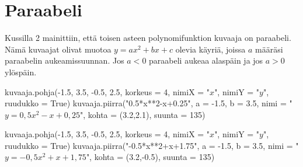 \section{Paraabeli}



Kussilla 2 mainittiin, että toisen asteen polynomifunktion kuvaaja on paraabeli. Nämä kuvaajat olivat muotoa $y=ax^2+bx+c$ olevia käyriä, joissa $a$ määräsi paraabelin aukeamissuunnan. Jos $a<0$ paraabeli aukeaa alaspäin ja jos $a>0$ ylöspäin.

\begin{kuva}
    kuvaaja.pohja(-1.5, 3.5, -0.5, 2.5, korkeus = 4, nimiX = "$x$", nimiY = "$y$", ruudukko = True)
    kuvaaja.piirra("0.5*x**2-x+0.25", a = -1.5, b = 3.5, nimi = "$y= 0,5x^2-x+0,25$", kohta = (3.2,2.1), suunta = 135)
\end{kuva}

\begin{kuva}
    kuvaaja.pohja(-1.5, 3.5, -0.5, 2.5, korkeus = 4, nimiX = "$x$", nimiY = "$y$", ruudukko = True)
    kuvaaja.piirra("-0.5*x**2+x+1.75", a = -1.5, b = 3.5, nimi = "$y= -0,5x^2+x+1,75$", kohta = (3.2,-0.5), suunta = 135)
\end{kuva}

